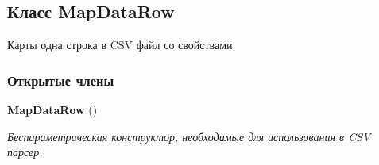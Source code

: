 \subsection{Класс Map\+Data\+Row}
\label{classkdz__manager_1_1_map_data_row}


Карты одна строка в C\+S\+V файл со свойствами.  


\subsubsection*{Открытые члены}
\begin{DoxyCompactItemize}
\item 
{\bf Map\+Data\+Row} ()
\begin{DoxyCompactList}\small\item\em Беспараметрическая конструктор, необходимые для использования в C\+S\+V парсер. \end{DoxyCompactList}\end{DoxyCompactItemize}
